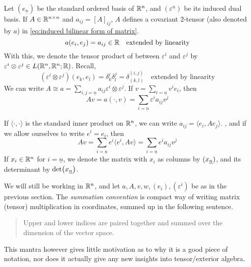 \documentclass[../main-v2-manifolds.tex]{subfiles}
\begin{document}
Let $(e_{\underline{n}})$ be the standard ordered basis of ${\mathbb{R}^n}$, and $(\varepsilon^{\underline{n}})$ be its induced dual basis. If $A\in\mathbb{R}^{n\times n}$ and $a_{ij} = [A]_{ij}$, $A$ defines a covariant $2$-tensor (also denoted by $a$) in \cref{eq:induced bilinear form of matrix}.
\begin{equation}
    a(e_i,e_j) = a_{ij}\in\mathbb{R}\quad\text{extended by linearity}
    \label{eq:induced bilinear form of matrix}
\end{equation}
With this, we denote the tensor product of between $\varepsilon^i$ and $\varepsilon^j$ by $\varepsilon^i\otimes \varepsilon^j\in L({\mathbb{R}^n},{\mathbb{R}^n};\mathbb{R})$. Recall,
\begin{equation}
    (\varepsilon^i\otimes \varepsilon^j)(e_k,e_l) = \delta^i_k\delta^j_l=\delta^{(i,j)}_{(k,l)}\quad\text{extended by linearity}
    \label{eq:tensor-product-dual-basis}
\end{equation}
We can write $A\cong a = \sum_{i,j=\underline{n}}a_{ij}\varepsilon^i\otimes\varepsilon^j$. If $v = \sum_{i=\underline{n}} v^i e_i$, then
\[
Av = a(\cdot, v)= \sum_{i=\underline{n}} \varepsilon^i a_{ij}v^j
\]

If $\langle \cdot,\cdot\rangle$ is the standard inner product on ${\mathbb{R}^n}$, we can write $a_{ij} = \langle e_i, Ae_j\rangle$. , and if we allow ourselves to write $e^i = e_i$, then
\[
    Av = \sum_{i=\underline{n}}e^i\langle e^i, Av\rangle = \sum_{i=\underline{n}}e^i a_{ij} v^j
\]
If $x_i\in{\mathbb{R}^n}$ for $i = \underline{n}$, we denote the matrix with $x_i$ as columns by $(\UL{x}[n])$, and its determinant by $\det(\UL{x}[n])$.



We will still be working in ${\mathbb{R}^n}$, and let $a, A, v, w, (e_i), (\varepsilon^i)$ be as in the previous section. The \emph{summation convention} is compact way of writing matrix (tensor) multiplication in coordinates, summed up in the following sentence.
\begin{quote}
Upper and lower indices are paired together and summed over the dimension of the vector space.    
\end{quote}
This mantra however gives little motivation as to why it is a good piece of notation, nor does it actually give any new insights into tensor/exterior algebra. \\
\end{document}

